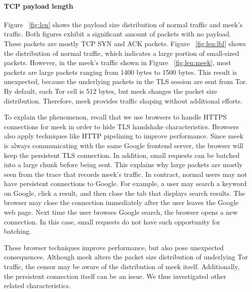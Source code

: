 \documentclass[conference]{IEEEtran}
\begin{document}
\paragraph{TCP payload length}
Figure ~\ref{fig:len} shows the payload size distribution of normal traffic and meek's traffic. Both
figures exhibit a significant amount of packets with no payload. These packets are mostly TCP SYN and ACK
packets. Figure ~\ref{fig:len:lbl} shows the distribution of normal traffic, which indicates a large portion
of small-sized packets. However, in the meek's traffic shown in Figure ~\ref{fig:len:meek}, most packets
are large packets ranging from 1400 bytes to 1500 bytes. This result is unexpected, because the underlying packets 
in the TLS session are sent from Tor. By default, each Tor cell is 512 bytes, but meek changes the packet size 
distribution. Therefore, meek provides traffic shaping without additional efforts.

To explain the phenomenon, recall that we use browsers to handle HTTPS connections for meek in order
to hide TLS handshake characteristics.
Browsers also apply techniques like HTTP pipelining to improve performance. Since meek is always communicating with
the same Google frontend server, the browser will keep the persistent TLS connection. In addition, small requests 
can be batched into a large chunk before being sent. This explains why large packets are mostly seen from the trace that
records meek's traffic.
In contract, normal users may not have persistent connections to Google. For example, a user may search a keyword on
Google, click a result, and then close the tab that displays search results. The browser may close the 
connection immediately after the user leaves the Google web page. Next time the user browses Google search, the browser 
opens a new connection. In this case, small requests do not have such opportunity for batching.

These browser techniques improve performance, but also pose unexpected consequences. 
Although meek alters the packet size distribution of underlying Tor traffic, 
the censor may be aware of the distribution of meek itself. 
Additionally, the persistent connection itself can be an issue.
We thus investigated other related characteristics.
\end{document}
